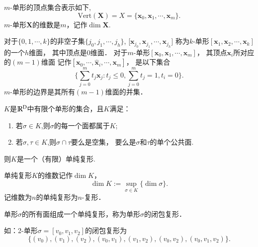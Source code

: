 \begin{defn}
	$m$-单形的顶点集合表示如下,
	\begin{equation*}
	\text{Vert}(\mathbf{X})=X=\{\mathbf{x}_0, \mathbf{x}_1, \cdots, \mathbf{x}_m\}.
	\end{equation*}
	$m$-单形$\mathbf{X}$的维数是$m$，记作$\dim \mathbf{X}.$
	\end{defn}
		

\begin{defn}
	对于$\{0,1,\cdots,k\}$的非空子集$\{j_0,j_1,\cdots,j_h\}$,
	[$\mathbf{x}_{j_0},\mathbf{x}_{j_1},\cdots,\mathbf{x}_{j_h}]$
	称为$k$-单形$[\mathbf{x}_1,\mathbf{x}_2,\cdots,\mathbf{x}_k]$的一个$h$维面，
	其中顶点是$0$维面．
	对于$m$-单形$[\mathbf{x}_0,\mathbf{x}_1,\cdots,\mathbf{x}_m]$，
	其顶点$\mathbf{x}_i$所对应的$(m-1)$维面
	记作$[\mathbf{x}_0,\cdots,\hat{\mathbf{x}}_i,\cdots,\mathbf{x}_m]$，
	是以下集合
	\begin{equation*}
	\{\sum_{j=0}^{m}t_j\mathbf{x}_j : t_j \leq 0, \sum_{j=0}^{m}t_j=1,t_i=0\}.
	\end{equation*}
	$m$-单形的边界是其所有$(m-1)$维面的并集．
\end{defn}


\begin{defn}
	\label{defn:simplex}
	$K$是$\mathbb{R}^{\textup{D}}$中有限个单形的集合，且$K$满足：
	\begin{enumerate}
		\setlength{\itemsep}{0pt}
		\setlength{\parsep}{0pt}
		\setlength{\parskip}{0pt}
		\item 若$\sigma\in K$,则$\sigma$的每一个面都属于$K$;
		\item 若$\sigma,\tau\in K$,则$\sigma \cap \tau $要么是空集，
		要么是$\sigma $和$\tau$的单个公共面.
	\end{enumerate}
		则$K$是一个（有限）单纯复形.
\end{defn}

\begin{defn}
	单纯复形$K$的维数记作$\dim K$，
	\begin{equation*}
		\dim K :=\sup_{\sigma\in K}\{\dim \sigma\}.
	\end{equation*}
	记维数为$n$的单纯复形为$n$-复形．
	\end{defn}

\begin{defn}
	单形$\sigma$的所有面组成一个单纯复形，称为单形$\sigma$的闭包复形．	
\end{defn}
如：2-单形$\sigma=[v_0,v_1,v_2]$的闭包复形为
\begin{equation*}
\{(v_0),(v_1),(v_2),(v_0,v_1),(v_1,v_2),(v_0,v_2),(v_0,v_1,v_2)\}.
\end{equation*}

